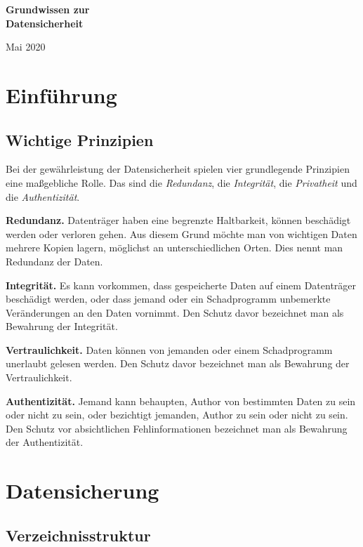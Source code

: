 \documentclass[a4paper,11pt,fleqn,twocolumn,twoside]{scrartcl}
\newcommand{\strong}[1]{\textsf{\textbf{#1}}}
\begin{document}
\thispagestyle{empty}

\noindent
{\LARGE\sffamily\bfseries
Grundwissen zur\\
Datensicherheit\par}

\vspace{1em}\noindent
Mai 2020

\tableofcontents

\section{Einführung}
\subsection{Wichtige Prinzipien}

Bei der gewährleistung der Datensicherheit spielen
vier grundlegende Prinzipien eine maßgebliche Rolle.
Das sind die \emph{Redundanz},
die \emph{Integrität}, die \emph{Privatheit} und die
\emph{Authentizität}.

\strong{Redundanz.}
Datenträger haben eine begrenzte Haltbarkeit, können beschädigt werden
oder verloren gehen. Aus diesem Grund möchte man von wichtigen Daten
mehrere Kopien lagern, möglichst an unterschiedlichen Orten.
Dies nennt man Redundanz der Daten.

\strong{Integrität.}
Es kann vorkommen, dass gespeicherte Daten auf einem Datenträger
beschädigt werden, oder dass jemand oder ein Schadprogramm
unbemerkte Veränderungen an den Daten vornimmt. Den Schutz davor
bezeichnet man als Bewahrung der Integrität.

\strong{Vertraulichkeit.}
Daten können von jemanden oder einem Schadprogramm unerlaubt
gelesen werden. Den Schutz davor bezeichnet man als
Bewahrung der Vertraulichkeit.

\strong{Authentizität.}
Jemand kann behaupten, Author von bestimmten Daten zu sein
oder nicht zu sein, oder bezichtigt jemanden, Author zu sein
oder nicht zu sein. Den Schutz vor absichtlichen Fehlinformationen
bezeichnet man als Bewahrung der Authentizität.

\section{Datensicherung}
\subsection{Verzeichnisstruktur}
\end{document}

